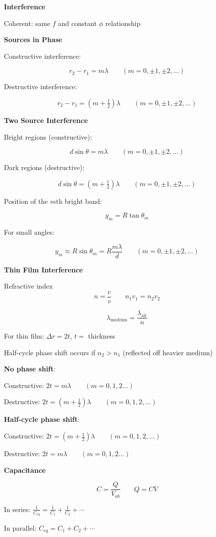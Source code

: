 \documentclass[10pt]{article}
\newcommand\sectionheading[1]{\begin{center}\large{\textbf{#1}}\end{center}\normalsize}
\newcommand\heading[1]{\medskip\textbf{#1}\medskip}
\begin{document}
\begin{multicols*}{3}
\sectionheading{Interference}

Coherent: same $f$ and constant $\phi$ relationship

\heading{Sources in Phase}

Constructive interference:

\[r_2-r_1=m\lambda \qquad (m=0,\pm 1, \pm2, \ldots)\]

Destructive interference:

\[r_2-r_1=(m+\tfrac12)\lambda \qquad (m=0,\pm 1, \pm 2, \ldots)\]

\heading{Two Source Interference}

Bright regions (constructive):

\[d\sin\theta=m\lambda \qquad (m=0,\pm 1,\pm 2,\ldots)\]

Dark regions (destructive):

\[d\sin\theta=(m+\tfrac12)\lambda \qquad (m=0,\pm 1,\pm 2,\ldots)\]

Position of the $m$th bright band:

\[y_m = R\tan \theta_m\]

For small angles:

\[y_m\approx R\sin\theta_m =R\frac{m\lambda}{d} \qquad (m=0,\pm 1,\pm 2,\ldots)\]

\heading{Thin Film Interference}

Refractive index 
\[n=\frac cv \qquad n_1 v_1 = n_2 v_2\]

\[\lambda_{\text{medium}}=\frac{\lambda_{\text{air}}}{n}\]

For thin film: $\Delta r=2t$, $t=$ thickness

Half-cycle phase shift occurs if $n_2 > n_1$ (reflected off heavier medium)

\textbf{No phase shift}:

Constructive: $2t=m\lambda\qquad (m=0,1,2\ldots)$

Destructive: $2t=(m+\tfrac12)\lambda\qquad (m=0,1,2,\ldots)$

\textbf{Half-cycle phase shift}:

Constructive: $2t=(m+\tfrac12)\lambda\qquad (m=0,1,2,\ldots)$

Destructive: $2t=m\lambda\qquad (m=0,1,2\ldots)$

\sectionheading{Capacitance}

\[C=\frac{Q}{V_{ab}} \qquad Q=CV\]

In series: $\frac{1}{C_{eq}}=\frac{1}{C_1}+\frac{1}{C_2}+\cdots$

In parallel: $C_{eq}=C_1+C_2+\cdots$


\end{multicols*}
\end{document}
